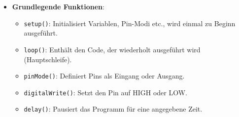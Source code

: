 \documentclass{vorlage-design-main}
\begin{document}
\begin{itemize}
\begin{itemize}
  \item
    \textbf{Grundlegende Funktionen}:

    \begin{itemize}
    
    \item
      \verb|setup()|: Initialisiert Variablen,
      Pin-Modi etc., wird einmal zu Beginn ausgeführt.
    \item
      \verb|loop()|: Enthält den Code, der wiederholt
      ausgeführt wird (Hauptschleife).
    \item
      \verb|pinMode()|: Definiert Pins als Eingang
      oder Ausgang.
    \item
      \verb|digitalWrite()|: Setzt den Pin auf HIGH
      oder LOW.
    \item
      \verb|delay()|: Pausiert das Programm für eine
      angegebene Zeit.
    \end{itemize}
  \end{itemize}
\end{itemize} %


\clearpage
\printbibliography
\end{document}
